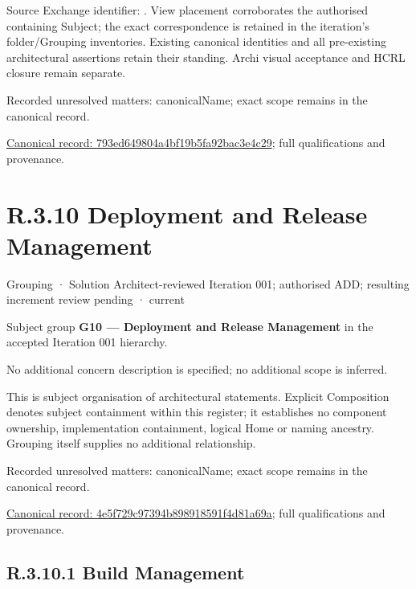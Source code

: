 Source Exchange identifier: \texttt{}. View placement corroborates
the authorised containing Subject; the exact correspondence is retained in the
iteration's folder/Grouping inventories. Existing canonical identities and all
pre-existing architectural assertions retain their standing. Archi visual
acceptance and HCRL closure remain separate.


{\small Recorded unresolved matters: canonicalName; exact scope remains in the canonical record.}\par
{\footnotesize \href{../../../../continuum/grouping/793ed649804a4bf19b5fa92bac3e4c29.md}{Canonical record: 793ed649804a4bf19b5fa92bac3e4c29}; full qualifications and provenance.}\par
\section*{R.3.10 Deployment and Release Management}
\label{navigation:R.3.10}

\label{element:4e5f729c97394b898918591f4d81a69a}
{\small Grouping · Solution Architect-reviewed Iteration 001; authorised ADD; resulting increment review pending · current}\par

Subject group \textbf{G10 — Deployment and Release Management} in the accepted Iteration 001 hierarchy.



No additional concern description is specified; no additional scope is inferred.



This is subject organisation of architectural statements. Explicit Composition denotes subject containment within this register; it establishes no component ownership, implementation containment, logical Home or naming ancestry. Grouping itself supplies no additional relationship.


{\small Recorded unresolved matters: canonicalName; exact scope remains in the canonical record.}\par
{\footnotesize \href{../../../../continuum/grouping/4e5f729c97394b898918591f4d81a69a.md}{Canonical record: 4e5f729c97394b898918591f4d81a69a}; full qualifications and provenance.}\par
\subsection*{R.3.10.1 Build Management}
\label{navigation:R.3.10.1}

